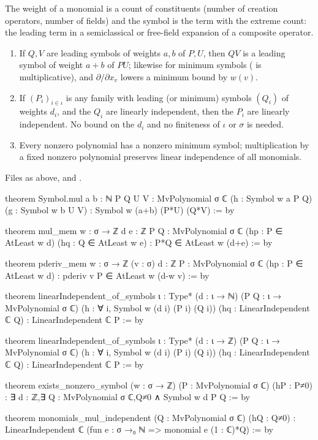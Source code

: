 \begin{physics}
The weight of a monomial is a count of constituents (number of creation operators, number of fields) and the symbol is the term with
the extreme count: the leading term in a semiclassical or free-field expansion of a composite operator.
\end{physics}


\begin{theorem}\label{l11:thm:symbols}
\begin{enumerate}
\item If $Q,V$ are leading symbols of weights $a,b$ of $P,U$, then $QV$ is a leading symbol of weight $a+b$ of $PU$;
  likewise for minimum symbols ( is multiplicative), and $\partial/\partial x_v$ lowers a minimum bound
  by $w(v)$.
\item If $(P_i)_{i\in\iota}$ is any family with leading (or minimum) symbols $(Q_i)$ of weights $d_i$, and the $Q_i$
  are linearly independent, then the $P_i$ are linearly independent. No bound on the $d_i$ and no finiteness of
  $\iota$ or $\sigma$ is needed.
\item Every nonzero polynomial has a nonzero minimum symbol; multiplication by a fixed nonzero polynomial preserves
  linear independence of all monomials.
\end{enumerate}
\end{theorem}
\noindent Files as above, and .
\begin{leancode}
theorem Symbol.mul {a b : ℕ} {P Q U V : MvPolynomial σ ℂ}
    (h : Symbol w a P Q) (g : Symbol w b U V) : Symbol w (a+b) (P*U) (Q*V) := by

theorem mul_mem {w : σ → ℤ} {d e : ℤ} {P Q : MvPolynomial σ ℂ}
    (hp : P ∈ AtLeast w d) (hq : Q ∈ AtLeast w e) : P*Q ∈ AtLeast w (d+e) := by

theorem pderiv_mem {w : σ → ℤ} (v : σ) {d : ℤ} {P : MvPolynomial σ ℂ}
    (hp : P ∈ AtLeast w d) : pderiv v P ∈ AtLeast w (d-w v) := by

theorem linearIndependent_of_symbols {ι : Type*} (d : ι → ℕ)
    (P Q : ι → MvPolynomial σ ℂ) (h : ∀ i, Symbol w (d i) (P i) (Q i))
    (hq : LinearIndependent ℂ Q) : LinearIndependent ℂ P := by

theorem linearIndependent_of_symbols {ι : Type*} (d : ι → ℤ)
    (P Q : ι → MvPolynomial σ ℂ) (h : ∀ i, Symbol w (d i) (P i) (Q i))
    (hq : LinearIndependent ℂ Q) : LinearIndependent ℂ P := by

theorem exists_nonzero_symbol (w : σ → ℤ) (P : MvPolynomial σ ℂ) (hP : P≠0) :
    ∃ d : ℤ,∃ Q : MvPolynomial σ ℂ,Q≠0 ∧ Symbol w d P Q := by

theorem monomials_mul_independent (Q : MvPolynomial σ ℂ) (hQ : Q≠0) :
    LinearIndependent ℂ (fun e : σ →₀ ℕ => monomial e (1 : ℂ)*Q) := by
\end{leancode}

